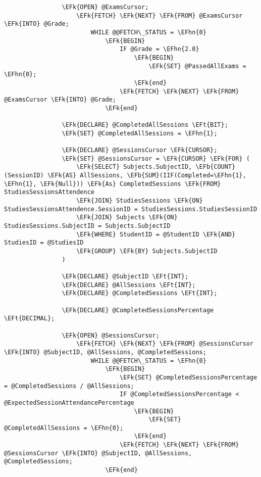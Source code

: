 \documentclass[11pt]{article}
\newcommand{\EFk}[1]{\textcolor{EFk}{\textbf{#1}}} %
\newcommand{\EFb}[1]{\textcolor{EFb}{\textbf{#1}}} %
\newcommand{\EFt}[1]{\textcolor{EFt}{\textbf{#1}}} %
\newcommand{\EFhn}[1]{\textcolor{EFhn}{#1}} %
\begin{document}
\begin{Code}
\begin{Verbatim}
                \EFk{OPEN} @ExamsCursor;
                    \EFk{FETCH} \EFk{NEXT} \EFk{FROM} @ExamsCursor \EFk{INTO} @Grade;
                        WHILE @@FETCH\_STATUS = \EFhn{0}
                            \EFk{BEGIN}
                                IF @Grade = \EFhn{2.0}
                                    \EFk{BEGIN}
                                        \EFk{SET} @PassedAllExams = \EFhn{0};
                                    \EFk{end}
                                \EFk{FETCH} \EFk{NEXT} \EFk{FROM} @ExamsCursor \EFk{INTO} @Grade;
                            \EFk{end}

                \EFk{DECLARE} @CompletedAllSessions \EFt{BIT};
                \EFk{SET} @CompletedAllSessions = \EFhn{1};

                \EFk{DECLARE} @SessionsCursor \EFk{CURSOR};
                \EFk{SET} @SessionsCursor = \EFk{CURSOR} \EFk{FOR} (
                    \EFk{SELECT} Subjects.SubjectID, \EFb{COUNT}(SessionID) \EFk{AS} AllSessions, \EFb{SUM}(IIF(Completed=\EFhn{1}, \EFhn{1}, \EFk{Null})) \EFk{As} CompletedSessions \EFk{FROM} StudiesSessionsAttendence
                    \EFk{JOIN} StudiesSessions \EFk{ON} StudiesSessionsAttendence.SessionID = StudiesSessions.StudiesSessionID
                    \EFk{JOIN} Subjects \EFk{ON} StudiesSessions.SubjectID = Subjects.SubjectID
                    \EFk{WHERE} StudentID = @StudentID \EFk{AND} StudiesID = @StudiesID
                    \EFk{GROUP} \EFk{BY} Subjects.SubjectID
                )

                \EFk{DECLARE} @SubjectID \EFt{INT};
                \EFk{DECLARE} @AllSessions \EFt{INT};
                \EFk{DECLARE} @CompletedSessions \EFt{INT};

                \EFk{DECLARE} @CompletedSessionsPercentage \EFt{DECIMAL};

                \EFk{OPEN} @SessionsCursor;
                    \EFk{FETCH} \EFk{NEXT} \EFk{FROM} @SessionsCursor \EFk{INTO} @SubjectID, @AllSessions, @CompletedSessions;
                        WHILE @@FETCH\_STATUS = \EFhn{0}
                            \EFk{BEGIN}
                                \EFk{SET} @CompletedSessionsPercentage = @CompletedSessions / @AllSessions;
                                IF @CompletedSessionsPercentage < @ExpectedSessionAttendancePercentage
                                    \EFk{BEGIN}
                                        \EFk{SET} @CompletedAllSessions = \EFhn{0};
                                    \EFk{end}
                                \EFk{FETCH} \EFk{NEXT} \EFk{FROM} @SessionsCursor \EFk{INTO} @SubjectID, @AllSessions, @CompletedSessions;
                            \EFk{end}


\end{Verbatim}
\end{Code}
\end{document}
